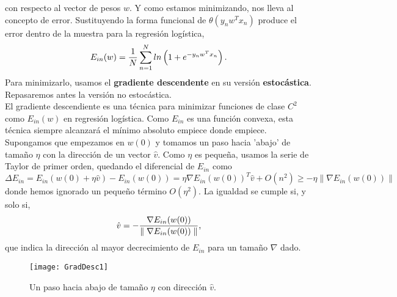 con respecto al vector de pesos $w$. Y como estamos minimizando, nos lleva al concepto de error. Sustituyendo la forma funcional de $\theta(y_{n}w^{T}x_{n})$ produce el error dentro de la muestra para la regresión logística,
\[ E_{in}(w) = \frac{1}{N}\sum_{n=1}^{N}ln \left(1 + e^{-y_{n}w^{T}x_{n}} \right) \textnormal{.}\]
Para minimizarlo, usamos el \textbf{gradiente descendente} en su versión \textbf{estocástica}. Repasaremos antes la versión no estocástica.\\
El gradiente descendiente es una técnica para minimizar funciones de clase  $C^{2}$ como $E_{in}(w)$ en regresión logística. Como $E_{in}$ es una función convexa, esta técnica siempre alcanzará el mínimo absoluto empiece donde empiece. Supongamos que empezamos en $w(0)$ y tomamos un paso hacia 'abajo' de tamaño $\eta$ con la dirección de un vector $\hat{v}$. Como $\eta$ es pequeña, usamos la serie de Taylor de primer orden, quedando el diferencial de $E_{in}$ como
\[ \Delta E_{in} = E_{in}(w(0)+ \eta \hat{v}) -E_{in}(w(0)) = \eta \nabla E_{in} (w(0))^{T} \hat{v} + O(n^{2}) \geq -\eta \parallel \nabla E_{in}(w(0)) \parallel \]
donde hemos ignorado un pequeño término $O(\eta^{2})$. La igualdad se cumple si, y solo si,
\[ \hat{v}=-\frac{\nabla E_{in}(w(0))}{\parallel \nabla E_{in}(w(0)) \parallel } \textnormal{,} \]
que indica la dirección al mayor decrecimiento de $E_{in}$ para un tamaño $\nabla$ dado. \cite{abu2012learning}
\begin{figure}[H]
  \centering
  \texttt{[image: GradDesc1]}
  \caption{Un paso hacia abajo de tamaño $\eta$ con dirección $\hat{v}$.}
  \label{fig:GradDesc1}
\end{figure}
\begin{center}
\cite{abu2012learning}
\end{center}

